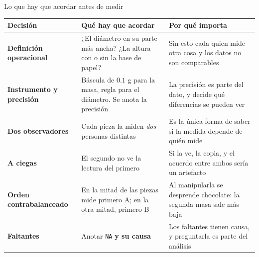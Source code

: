 \begin{frame}{Lo que hay que acordar antes de medir}
  \centering
  {\scriptsize
  \begin{tabular}{@{}p{2.9cm}p{4.4cm}p{5.0cm}@{}}
    \toprule
    \textbf{Decisión} & \textbf{Qué hay que acordar} & \textbf{Por qué importa} \\
    \midrule
    \textbf{Definición operacional} & ¿El diámetro en su parte más ancha? ¿La altura
      con o sin la base de papel? &
      Sin esto cada quien mide otra cosa y los datos no son comparables \\
    \textbf{Instrumento y precisión} & Báscula de $0.1$ g para la masa, regla para el
      diámetro. Se anota la precisión &
      La precisión es parte del dato, y decide qué diferencias se pueden ver \\
    \textbf{Dos observadores} & Cada pieza la miden \emph{dos} personas distintas &
      Es la única forma de saber si la medida depende de quién mide \\
    \textbf{A ciegas} & El segundo no ve la lectura del primero &
      Si la ve, la copia, y el acuerdo entre ambos sería un artefacto \\
    \textbf{Orden contrabalanceado} & En la mitad de las piezas mide primero A; en la
      otra mitad, primero B &
      Al manipularla se desprende chocolate: la segunda masa sale más baja \\
    \textbf{Faltantes} & Anotar \texttt{NA} \textbf{y su causa} &
      Los faltantes tienen causa, y preguntarla es parte del análisis \\
    \bottomrule
  \end{tabular}}
  \vspace{0.35cm}

  \raggedright
\end{frame}
